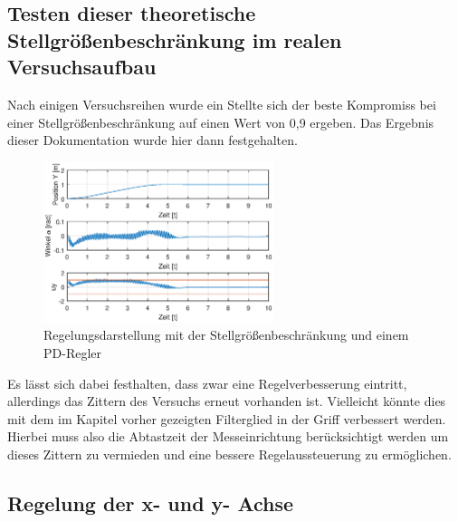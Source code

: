 \documentclass[10pt]{scrartcl}
\begin{document}
\subsection{Testen dieser theoretische Stellgrößenbeschränkung im realen Versuchsaufbau}
Nach einigen Versuchsreihen wurde ein Stellte sich der beste Kompromiss bei einer Stellgrößenbeschränkung auf einen Wert von 0,9 ergeben. Das Ergebnis dieser Dokumentation wurde hier dann festgehalten.

\begin{figure}[H]
	\centering
	\includegraphics[width=0.6\textwidth]{Figure45b5mitSaturation}
	\caption{Regelungsdarstellung mit der Stellgrößenbeschränkung und einem PD-Regler}
	\label{img:grafik-dummy}
\end{figure}

Es lässt sich dabei festhalten, dass zwar eine Regelverbesserung eintritt, allerdings das Zittern des Versuchs erneut vorhanden ist. Vielleicht könnte dies mit dem im Kapitel vorher gezeigten Filterglied in der Griff verbessert werden. Hierbei muss also die Abtastzeit der Messeinrichtung berücksichtigt werden um dieses Zittern zu vermieden und eine bessere Regelaussteuerung zu ermöglichen.
\subsection{Regelung der x- und y- Achse}

\newpage
\listoffigures
\end{document}
